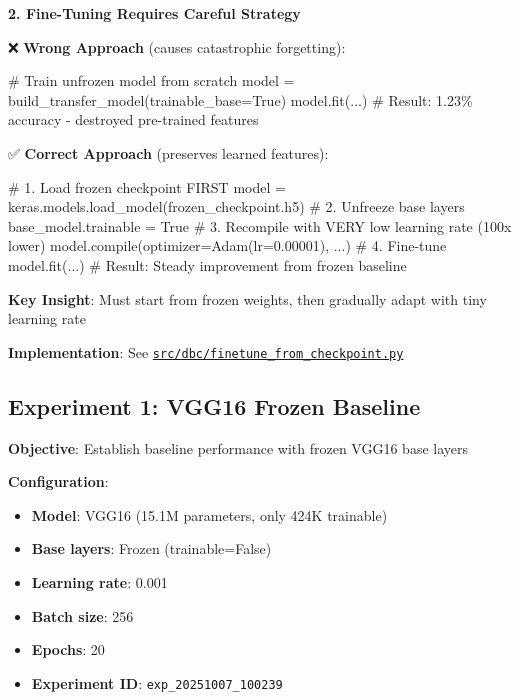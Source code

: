 \documentclass[
  letterpaper,
  DIV=11,
  numbers=noendperiod]{scrartcl}
\newenvironment{Shaded}{\begin{snugshade}}{\end{snugshade}}
\newcommand{\BuiltInTok}[1]{\textcolor[rgb]{0.00,0.23,0.31}{#1}}
\newcommand{\CommentTok}[1]{\textcolor[rgb]{0.37,0.37,0.37}{#1}}
\newcommand{\FloatTok}[1]{\textcolor[rgb]{0.68,0.00,0.00}{#1}}
\newcommand{\NormalTok}[1]{\textcolor[rgb]{0.00,0.23,0.31}{#1}}
\newcommand{\OperatorTok}[1]{\textcolor[rgb]{0.37,0.37,0.37}{#1}}
\newcommand{\StringTok}[1]{\textcolor[rgb]{0.13,0.47,0.30}{#1}}
\newcommand{\VariableTok}[1]{\textcolor[rgb]{0.07,0.07,0.07}{#1}}
\providecommand{\tightlist}{%
  \setlength{\itemsep}{0pt}\setlength{\parskip}{0pt}}
\renewenvironment{Shaded}{%
  \begin{tcolorbox}[%
    enhanced,%
    colback=codebg,%
    colframe=codebg,%
    borderline west={3pt}{0pt}{sectionblue},%
    boxrule=0pt,%
    arc=0pt,%
    boxsep=5pt,%
    left=2mm,%
    right=2mm,%
    top=2mm,%
    bottom=2mm%
  ]%
}{%
  \end{tcolorbox}%
}
\begin{document}
\textbf{2. Fine-Tuning Requires Careful Strategy}

❌ \textbf{Wrong Approach} (causes catastrophic forgetting):

\begin{Shaded}
\begin{Highlighting}[]
\CommentTok{\# Train unfrozen model from scratch}
\NormalTok{model }\OperatorTok{=}\NormalTok{ build\_transfer\_model(trainable\_base}\OperatorTok{=}\VariableTok{True}\NormalTok{)}
\NormalTok{model.fit(...)  }\CommentTok{\# Result: 1.23\% accuracy {-} destroyed pre{-}trained features}
\end{Highlighting}
\end{Shaded}

✅ \textbf{Correct Approach} (preserves learned features):

\begin{Shaded}
\begin{Highlighting}[]
\CommentTok{\# 1. Load frozen checkpoint FIRST}
\NormalTok{model }\OperatorTok{=}\NormalTok{ keras.models.load\_model(}\StringTok{\textquotesingle{}frozen\_checkpoint.h5\textquotesingle{}}\NormalTok{)}
\CommentTok{\# 2. Unfreeze base layers}
\NormalTok{base\_model.trainable }\OperatorTok{=} \VariableTok{True}
\CommentTok{\# 3. Recompile with VERY low learning rate (100x lower)}
\NormalTok{model.}\BuiltInTok{compile}\NormalTok{(optimizer}\OperatorTok{=}\NormalTok{Adam(lr}\OperatorTok{=}\FloatTok{0.00001}\NormalTok{), ...)}
\CommentTok{\# 4. Fine{-}tune}
\NormalTok{model.fit(...)  }\CommentTok{\# Result: Steady improvement from frozen baseline}
\end{Highlighting}
\end{Shaded}

\textbf{Key Insight}: Must start from frozen weights, then gradually
adapt with tiny learning rate

\textbf{Implementation}: See
\href{../src/dbc/finetune_from_checkpoint.py}{\texttt{src/dbc/finetune\_from\_checkpoint.py}}

\subsection{Experiment 1: VGG16 Frozen
Baseline}\label{experiment-1-vgg16-frozen-baseline}

\textbf{Objective}: Establish baseline performance with frozen VGG16
base layers

\textbf{Configuration}:

\begin{itemize}
\tightlist
\item
  \textbf{Model}: VGG16 (15.1M parameters, only 424K trainable)
\item
  \textbf{Base layers}: Frozen (trainable=False)
\item
  \textbf{Learning rate}: 0.001
\item
  \textbf{Batch size}: 256
\item
  \textbf{Epochs}: 20
\item
  \textbf{Experiment ID}: \texttt{exp\_20251007\_100239}
\end{itemize}
\end{document}
